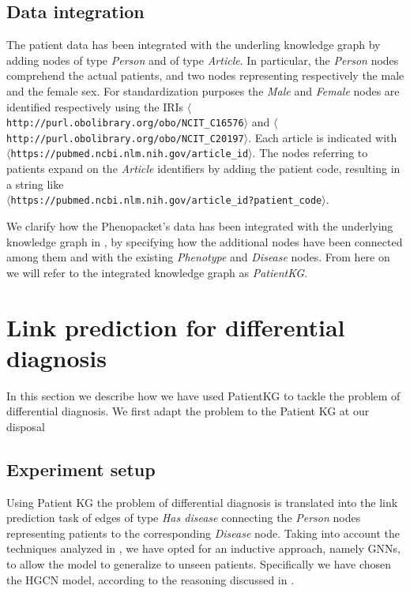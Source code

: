 \subsection{Data integration}
The patient data has been integrated with the underling knowledge graph by adding nodes of type \emph{Person} and of type \emph{Article}. In particular, the \emph{Person} nodes comprehend the actual patients, and two nodes representing respectively the male and the female sex. For standardization purposes the \emph{Male} and \emph{Female} nodes are identified respectively using the IRIs \texttt{$\langle$http://purl.obolibrary.org/obo/NCIT\_C16576$\rangle$} and \texttt{$\langle$http://purl.obolibrary.org/obo/NCIT\_C20197$\rangle$}. Each article is indicated with \\ \texttt{$\langle$https://pubmed.ncbi.nlm.nih.gov/{article\_id}$\rangle$}. The nodes referring to patients expand on the \emph{Article} identifiers by adding the patient code, resulting in a string like \\ \texttt{$\langle$https://pubmed.ncbi.nlm.nih.gov/{article\_id}?{patient\_code}$\rangle$}. 

We clarify how the Phenopacket's data has been integrated with the underlying knowledge graph in , by specifying how the additional nodes have been connected among them and with the existing \emph{Phenotype} and \emph{Disease} nodes. From here on we will refer to the integrated knowledge graph as \emph{PatientKG}.


\section{Link prediction for differential diagnosis}\label{sec:linkPredictionDiffDiagnosis}
In this section we describe how we have used PatientKG to tackle the problem of differential diagnosis. We first adapt the problem to the Patient KG at our disposal

\subsection{Experiment setup}
Using Patient KG the problem of differential diagnosis is translated into the link prediction task of edges of type \emph{Has disease} connecting the \emph{Person} nodes representing patients to the corresponding \emph{Disease} node. Taking into account the techniques analyzed in , we have opted for an inductive approach, namely GNNs, to allow the model to generalize to unseen patients. Specifically we have chosen the HGCN model, according to the reasoning discussed in .


